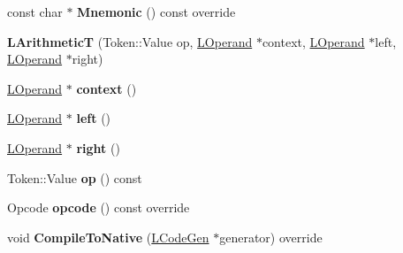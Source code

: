 \begin{DoxyCompactItemize}
\item 
const char $\ast$ {\bfseries Mnemonic} () const  override\hypertarget{classv8_1_1internal_1_1_l_arithmetic_t_abaa7a014d65c1b89c93ab7fc44003c15}{}\label{classv8_1_1internal_1_1_l_arithmetic_t_abaa7a014d65c1b89c93ab7fc44003c15}

\item 
{\bfseries L\+ArithmeticT} (Token\+::\+Value op, \hyperlink{classv8_1_1internal_1_1_l_operand}{L\+Operand} $\ast$context, \hyperlink{classv8_1_1internal_1_1_l_operand}{L\+Operand} $\ast$left, \hyperlink{classv8_1_1internal_1_1_l_operand}{L\+Operand} $\ast$right)\hypertarget{classv8_1_1internal_1_1_l_arithmetic_t_aed09089ca0bd6bd7614897b04b1d89d6}{}\label{classv8_1_1internal_1_1_l_arithmetic_t_aed09089ca0bd6bd7614897b04b1d89d6}

\item 
\hyperlink{classv8_1_1internal_1_1_l_operand}{L\+Operand} $\ast$ {\bfseries context} ()\hypertarget{classv8_1_1internal_1_1_l_arithmetic_t_ab306728ac49c78f6fe8eec0faafec98d}{}\label{classv8_1_1internal_1_1_l_arithmetic_t_ab306728ac49c78f6fe8eec0faafec98d}

\item 
\hyperlink{classv8_1_1internal_1_1_l_operand}{L\+Operand} $\ast$ {\bfseries left} ()\hypertarget{classv8_1_1internal_1_1_l_arithmetic_t_a62140bad6c260c92f8c86d7083874a9c}{}\label{classv8_1_1internal_1_1_l_arithmetic_t_a62140bad6c260c92f8c86d7083874a9c}

\item 
\hyperlink{classv8_1_1internal_1_1_l_operand}{L\+Operand} $\ast$ {\bfseries right} ()\hypertarget{classv8_1_1internal_1_1_l_arithmetic_t_ad65b8493527788115befa0634f9de1ae}{}\label{classv8_1_1internal_1_1_l_arithmetic_t_ad65b8493527788115befa0634f9de1ae}

\item 
Token\+::\+Value {\bfseries op} () const \hypertarget{classv8_1_1internal_1_1_l_arithmetic_t_ab6979d3ffa80748d912d58539cfe971c}{}\label{classv8_1_1internal_1_1_l_arithmetic_t_ab6979d3ffa80748d912d58539cfe971c}

\item 
Opcode {\bfseries opcode} () const  override\hypertarget{classv8_1_1internal_1_1_l_arithmetic_t_a8fb5ae23dc6ddac5a72adfe9028fb08d}{}\label{classv8_1_1internal_1_1_l_arithmetic_t_a8fb5ae23dc6ddac5a72adfe9028fb08d}

\item 
void {\bfseries Compile\+To\+Native} (\hyperlink{classv8_1_1internal_1_1_l_code_gen}{L\+Code\+Gen} $\ast$generator) override\hypertarget{classv8_1_1internal_1_1_l_arithmetic_t_a2ca63e96840eacc1494d0d39ebe782a5}{}\label{classv8_1_1internal_1_1_l_arithmetic_t_a2ca63e96840eacc1494d0d39ebe782a5}


\end{DoxyCompactItemize}
